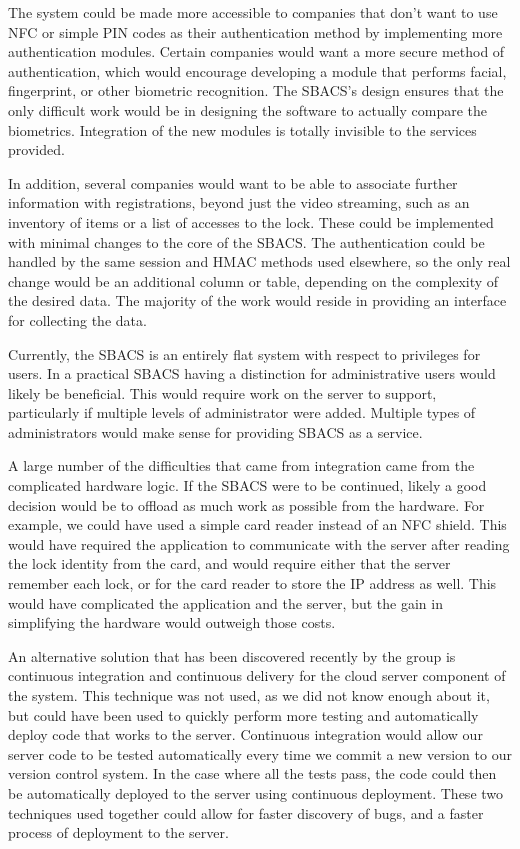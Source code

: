 \documentclass[12pt]{report}
\begin{document}
The system could be made more accessible to companies that don't want to use NFC or simple PIN codes as their
authentication method by implementing more authentication modules. Certain companies would want a more secure method of
authentication, which would encourage developing a module that performs facial, fingerprint, or other biometric
recognition. The SBACS's design ensures that the only difficult work would be in designing the software to actually
compare the biometrics. Integration of the new modules is totally invisible to the services provided.

In addition, several companies would want to be able to associate further information with registrations, beyond just
the video streaming, such as an inventory of items or a list of accesses to the lock. These could be implemented with
minimal changes to the core of the SBACS. The authentication could be handled by the same session and HMAC methods used
elsewhere, so the only real change would be an additional column or table, depending on the complexity of the desired
data. The majority of the work would reside in providing an interface for collecting the data.

Currently, the SBACS is an entirely flat system with respect to privileges for users. In a practical SBACS having a
distinction for administrative users would likely be beneficial. This would require work on the server to support,
particularly if multiple levels of administrator were added. Multiple types of administrators would make sense for
providing SBACS as a service.

A large number of the difficulties that came from integration came from the complicated hardware logic. If the SBACS
were to be continued, likely a good decision would be to offload as much work as possible from the hardware. For
example, we could have used a simple card reader instead of an NFC shield. This would have required the application to
communicate with the server after reading the lock identity from the card, and would require either that the server
remember each lock, or for the card reader to store the IP address as well. This would have complicated the application
and the server, but the gain in simplifying the hardware would outweigh those costs.

An alternative solution that has been discovered recently by the group is continuous integration and continuous
delivery for the cloud server component of the system. This technique was not used, as we did not know enough about
it, but could have been used to quickly perform more testing and automatically deploy code that works to the server.
Continuous integration would allow our server code to be tested automatically every time we commit a new version to our
version control system. In the case where all the tests pass, the code could then be automatically deployed to the
server using continuous deployment. These two techniques used together could allow for faster discovery of bugs, and
a faster process of deployment to the server.
\end{document}
